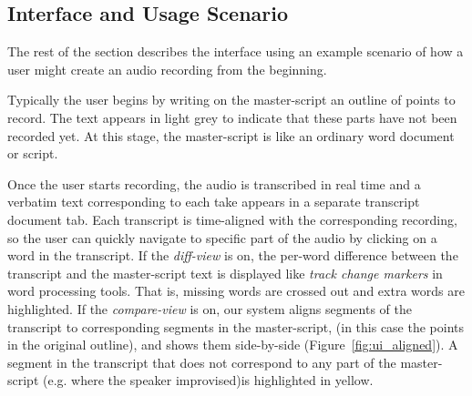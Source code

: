 
\subsection{Interface and Usage Scenario}
The rest of the section describes the interface using an example scenario of how a user might create an audio recording from the beginning. 

Typically the user begins by writing on the master-script an outline  of points to record. The text appears in light grey to indicate that these parts have not been recorded yet. At this stage, the master-script is like an ordinary
word document or script. 

Once the user starts recording, the audio is transcribed in real time and a verbatim text corresponding to each take appears in a separate transcript document tab. Each transcript is time-aligned with the corresponding recording, so the user can quickly navigate to specific
part of the audio by clicking on a word in the transcript. If the \textit{diff-view} is on, the per-word difference between the transcript and the master-script text is displayed like \textit{track change markers} in word processing tools. That is, missing words are crossed out and extra words are highlighted. If the \textit{compare-view} is on, our system aligns segments of the transcript to corresponding segments in the master-script, (in this case the points in the original outline), and shows them side-by-side (Figure~\ref{fig:ui_aligned}). A segment in the transcript that does not correspond to any part of the master-script (e.g. where the speaker improvised)is highlighted in yellow.


